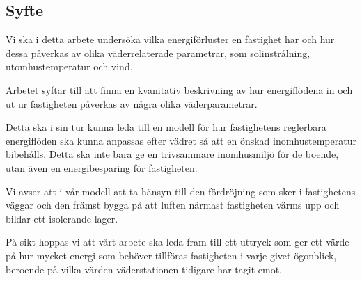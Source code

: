 \subsection{Syfte}
Vi ska i detta arbete undersöka vilka energiförluster en fastighet har och hur dessa påverkas av olika väderrelaterade parametrar, som solinstrålning, utomhustemperatur och vind.

Arbetet syftar till att finna en kvanitativ beskrivning av hur energiflödena in och ut ur fastigheten påverkas av några olika väderparametrar. 

Detta ska i sin tur kunna leda till en modell för hur fastighetens reglerbara energiflöden ska kunna anpassas efter vädret så att en önskad inomhustemperatur bibehålls. Detta ska inte bara ge en trivsammare inomhusmiljö för de boende, utan även en energibesparing för fastigheten.

Vi avser att i vår modell att ta hänsyn till den fördröjning som sker i fastighetens väggar och den främst bygga på att luften närmast fastigheten värms upp och bildar ett isolerande lager.

På sikt hoppas vi att vårt arbete ska leda fram till ett uttryck som ger ett värde på hur mycket energi som behöver tillföras fastigheten i varje givet ögonblick, beroende på vilka värden väderstationen tidigare har tagit emot.